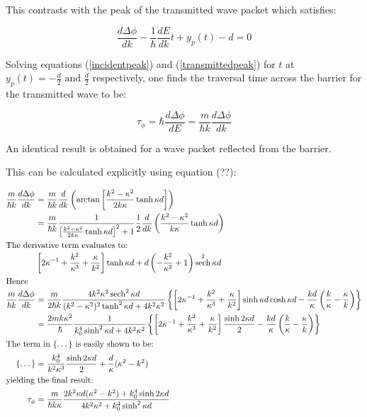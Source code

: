 \documentclass{article}
\DeclareMathOperator{\sech}{sech}
\begin{document}
\noindent This contrasts with the peak of the transmitted wave packet which satisfies:

\begin{equation}
	\frac{d\Delta\phi}{dk}-\frac{1}{\hbar}\frac{dE}{dk}t+y_p(t)-d=0
	\label{transmittedpeak}
\end{equation}

\noindent Solving equations (\ref{incidentpeak}) and (\ref{transmittedpeak}) for $t$ at $y_p(t) = -\frac{d}{2} \text{ and } \frac{d}{2}$ respectively, one finds the traversal time across the barrier for the transmitted wave to be:

\begin{equation}
	\tau_\phi = \hbar \frac{d\Delta\phi}{dE} = \frac{m}{\hbar k}\frac{d\Delta\phi}{dk}
	\label{buttikerphasetime}
\end{equation}

\noindent An identical result is obtained for a wave packet reflected from the barrier.

\noindent This can be calculated explicitly using equation (??):

\begin{align}
	\frac{m}{\hbar k}\frac{d\Delta\phi}{dk}&=\frac{m}{\hbar k}\frac{d}{dk}\left(\arctan{\left[\frac{k^2-\kappa^2}{2k\kappa}\tanh{\kappa d}\right]}\right) \\
					       &=\frac{m}{\hbar k}\frac{1}{\left[\frac{k^2-\kappa^2}{2k\kappa}\tanh{\kappa d}\right]^2+1}\frac{1}{2}\frac{d}{dk}\left(\frac{k^2-\kappa^2}{k\kappa}\tanh{\kappa d}\right) \\ \intertext{The derivative term evaluates to:}
					       &\left[2\kappa^{-1}+\frac{k^2}{\kappa^3}+\frac{\kappa}{k^2}\right]\tanh{\kappa d} + d\left(-\frac{k^2}{\kappa^2}+1\right)\sech^2{\kappa d}\\ \intertext{Hence}
	\frac{m}{\hbar k}\frac{d\Delta\phi}{dk}&=\frac{m}{2\hbar k}\frac{4k^2\kappa^2\sech^2{\kappa d}}{(k^2-\kappa^2)^2\tanh^2{\kappa d}+4k^2\kappa^2}\left\{\left[2\kappa^{-1}+\frac{k^2}{\kappa^3}+\frac{\kappa}{k^2}\right]\sinh{\kappa d}\cosh{\kappa d}-\frac{kd}{\kappa}\left(\frac{k}{\kappa}-\frac{\kappa}{k}\right)\right\}\\
					       &=\frac{2mk\kappa^2}{\hbar}\frac{1}{k_0^4\sinh^2{\kappa d}+4k^2\kappa^2}\left\{\left[2\kappa^{-1}+\frac{k^2}{\kappa^3}+\frac{\kappa}{k^2}\right]\frac{\sinh{2\kappa d}}{2}-\frac{kd}{\kappa}\left(\frac{k}{\kappa}-\frac{\kappa}{k}\right)\right\} \\ \intertext{The term in \{\dots\} is easily shown to be:}
	\{\dots\} &= \frac{k_0^4}{k^2\kappa^3}\frac{\sinh{2\kappa d}}{2}+\frac{d}{\kappa}(\kappa^2-k^2) \\ \intertext{yielding the final result:}
	\tau_\phi &= \frac{m}{\hbar k \kappa}\frac{2k^2\kappa d(\kappa^2-k^2)+k_0^4\sinh{2\kappa d}}{4k^2\kappa^2+k_0^4\sinh^2{\kappa d}} \label{phasedelaytime}
\end{align}
\end{document}

